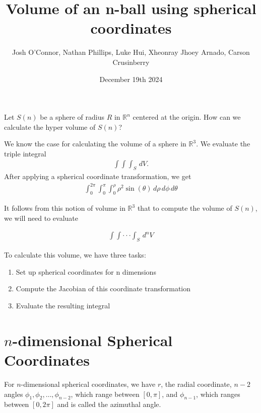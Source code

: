 \documentclass{article}
\title{Volume of an n-ball using spherical coordinates}
\author{Josh O'Connor, Nathan Phillips, Luke Hui, Xheonray Jhoey Arnado, Carson Crusinberry}
\date{December 19th 2024}
\begin{document}
\maketitle

Let $S(n)$ be a sphere of radius $R$ in $\mathbb{R}^n$ centered at the origin. How can we calculate the hyper volume of $S(n)$?

We know the case for calculating the volume of a sphere in $\mathbb{R}^3$. We evaluate the triple integral 
    \begin{align*}
    \int\int\int_S\,dV. 
    \end{align*}
    After applying a spherical coordinate transformation, we get 
    \begin{align*}
    \int_0^{2\pi}\int_0^{\pi}\int_0^{\rho}\rho^2\sin(\theta)\,d\rho\,d\phi\,d\theta 
    \end{align*}

It follows from this notion of volume in $\mathbb{R}^3$ that to compute the volume of $S(n)$, we will need to evaluate

    \begin{align*}
        \int\int\cdot\cdot\cdot\int_S\,d^nV
    \end{align*}
    
    To calculate this volume, we have three tasks:
    \begin{enumerate}
        \item Set up spherical coordinates for n dimensions
        \item Compute the Jacobian of this coordinate transformation
        \item Evaluate the resulting integral
    \end{enumerate}
    
\section*{$n$-dimensional Spherical Coordinates}    
For $n$-dimensional spherical coordinates, we have $r$, the radial coordinate, $n-2$ angles $\phi_1, \phi_2, \dots, \phi_{n-2}$, which range between $[0, \pi]$, and $\phi_{n-1}$, which ranges between $[0, 2\pi]$ and is called the azimuthal angle.
\end{document}
